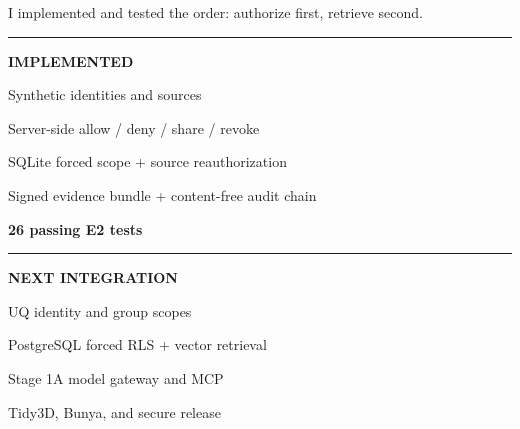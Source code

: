 \documentclass[aspectratio=169,10pt]{beamer}
\begin{document}
\begin{frame}[plain,t]
\begin{uqbody}
  \UQTakeaway
    {I implemented and tested the order: authorize first, retrieve second.}
    {}

  \vspace{4.0mm}
  \begin{minipage}[t]{0.47\linewidth}
    {\color{StatusPinned}\rule{\linewidth}{1.2pt}}\par\vspace{1.0mm}
    {\color{StatusPinned}\fontsize{6.7}{7.9}\selectfont\bfseries IMPLEMENTED}\par
    \vspace{1.4mm}
    {\fontsize{8.0}{9.7}\selectfont
      Synthetic identities and sources\par\vspace{1.1mm}
      Server-side allow / deny / share / revoke\par\vspace{1.1mm}
      SQLite forced scope + source reauthorization\par\vspace{1.1mm}
      Signed evidence bundle + content-free audit chain\par\vspace{1.1mm}
      \textbf{26 passing E2 tests}}
  \end{minipage}\hfill
  \begin{minipage}[t]{0.47\linewidth}
    {\color{StatusReview}\rule{\linewidth}{1.2pt}}\par\vspace{1.0mm}
    {\color{StatusReview}\fontsize{6.7}{7.9}\selectfont\bfseries NEXT INTEGRATION}\par
    \vspace{1.4mm}
    {\fontsize{8.0}{9.7}\selectfont
      UQ identity and group scopes\par\vspace{1.1mm}
      PostgreSQL forced RLS + vector retrieval\par\vspace{1.1mm}
      Stage 1A model gateway and MCP\par\vspace{1.1mm}
      Tidy3D, Bunya, and secure release}
  \end{minipage}\hfill

  \vspace{7.0mm}
  \centering
  \hspace{2mm}
  \hspace{2mm}
\end{uqbody}
\end{frame}
\end{document}
